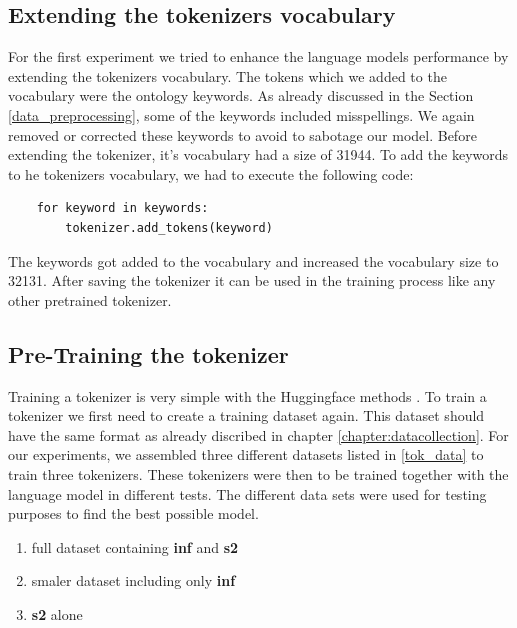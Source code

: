 \subsection{Extending the tokenizers vocabulary}
For the first experiment we tried to enhance the language models performance by extending the tokenizers vocabulary. The tokens which we added to the vocabulary were the ontology keywords. As already discussed in the Section \ref{data_preprocessing}, some of the keywords included misspellings. We again removed or corrected these keywords to avoid to sabotage our model. \newline
Before extending the tokenizer, it's vocabulary had a size of 31944. To add the keywords to he tokenizers vocabulary, we had to execute the following code:

\begin{code}
	\label{code:extend_tokenizer}
\begin{verbatim}
	for keyword in keywords:
		tokenizer.add_tokens(keyword)
\end{verbatim}
\end{code}

The keywords got added to the vocabulary and increased the vocabulary size to 32131. After saving the tokenizer it can be used in the training process like any other pretrained tokenizer.

\subsection{Pre-Training the tokenizer}\label{chapter:training-tokenizer}
Training a tokenizer is very simple with the Huggingface methods \cite{trainer}. To train a tokenizer we first need to create a training dataset again. This dataset should have the same format as already discribed in chapter \ref{chapter:datacollection}. For our experiments, we assembled three different datasets listed in \ref{tok_data} to train three tokenizers. These tokenizers were then to be trained together with the language model in different tests. The different data sets were used for testing purposes to find the best possible model. 

\begin{enumerate} \label{tok_data}
	\item full dataset containing \textbf{inf} and \textbf{s2}
	\item smaler dataset including only \textbf{inf}
	\item \textbf{s2} alone
\end{enumerate}

